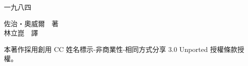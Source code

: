 \pagestyle{empty}
\setlength{\parindent}{0em}
\begin{centering}
\begin{vplace}[12]
\HUGE 一九八四
\end{vplace}
\begin{vplace}[5]
{\normalsize 佐治・奧威爾　著\\
林立崑　譯} 
\end{vplace}
\end{centering}
\begin{vplace}[20]
\scriptsize 本著作採用創用 CC 姓名標示-非商業性-相同方式分享 3.0 Unported 授權條款授權。
\end{vplace}
\cleardoublepage
